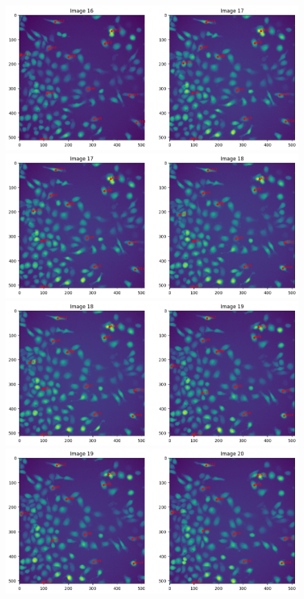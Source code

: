 \documentclass{article}
\begin{document}
\begin{figure}[h!]
\centering
\includegraphics[width=0.75\linewidth]{Report/RImages/Traces_Control/image_17a.png}
\includegraphics[width=0.75\linewidth]{Report/RImages/Traces_Control/image_18a.png}
\includegraphics[width=0.75\linewidth]{Report/RImages/Traces_Control/image_19a.png}
\includegraphics[width=0.75\linewidth]{Report/RImages/Traces_Control/image_20a.png}
\end{figure}
\clearpage
\end{document}
